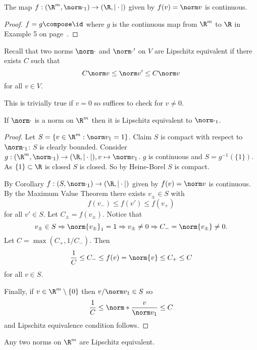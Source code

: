 \documentclass[a4paper]{article}
\theoremstyle{definition}
\begin{document}
\begin{corollary}
  The map \(f:(\R^m, \norm \cdot_1) \to (\R, |\cdot|)\) given by \(f(v) = \norm v\) is continuous.
\end{corollary}

\begin{proof}
  \(f = g\compose \id\) where \(g\) is the continuous map from \(\R^m\) to \(\R\) in Example 5 on page~\pageref{eg:continuity}.
\end{proof}

Recall that two norms \(\norm \cdot\) and \(\norm \cdot'\) on \(V\) are Lipschitz equivalent if there exists \(C\) such that
\[
  C\norm v \leq \norm v' \leq C \norm v
\]
for all \(v\in V\).

\begin{remark}
  This is trivially true if \(v=0\) so suffices to check for \(v\neq0\).
\end{remark}

\begin{theorem}
  \label{thm:Lipschitz equivalence}
  If \(\norm \cdot\) is a norm on \(\R^m\) then it is Lipschitz equivalent to \(\norm \cdot_1\).
\end{theorem}

\begin{proof}
  \label{proof:Lipschitz equivalence}
  Let \(S = \{v\in \R^m: \norm v_1 = 1 \}\). Claim \(S\) is compact with respect to \(\norm \cdot_1\): \(S\) is clearly bounded. Consider \(g:(\R^m, \norm \cdot_1) \to (\R, |\cdot|), v\mapsto \norm v_1\). \(g\) is continuous and \(S = g^{-1}(\{1\})\). As \(\{1\} \subset \R\) is closed \(S\) is closed. So by Heine-Borel \(S\) is compact.

  By Corollary \(f:(S, \norm \cdot_1) \to (\R, |\cdot|)\) given by \(f(v) = \norm v\) is continuous. By the Maximum Value Theorem there exists \(v_\pm\in S\) with
  \[
    f(v_-) \leq f(v') \leq f(v_+)
  \]
  for all \(v' \in S\). Let \(C_\pm = f(v_\pm)\). Notice that
  \[
    v_\pm\in S \Rightarrow \norm{v_\pm}_1 = 1 \Rightarrow v_\pm \neq0 \Rightarrow C_-=\norm{v_\pm} \neq 0.
  \]
  Let \(C = \max(C_+,1/C_-)\). Then
  \[
    \frac{1}{C} \leq C_- \leq f(v) = \norm{v} \leq C_+ \leq C
  \]
  for all \(v \in S\).

  Finally, if \(v \in \R^m\setminus\{0\}\) then \(v/\norm v_1 \in S\) so
  \[
    \frac{1}{C} \leq \norm*{\frac{v}{\norm v_1}} \leq C
  \]
  and Lipschitz equivalence condition follows.
\end{proof}

\begin{corollary}
  Any two norms on \(\R^m\) are Lipschitz equivalent.
\end{corollary}
\end{document}
